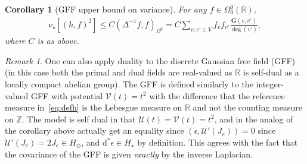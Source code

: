 \documentclass[11pt, reqno]{amsart}
\newtheorem{corollary}[theorem]{Corollary}
\numberwithin{equation}{section}
\theoremstyle{definition}
\theoremstyle{remark}
\newtheorem{remark}{Remark}
\renewcommand{\d}{\mathrm{d}}
\newcommand{\Green}{\ensuremath{\mathbf{G}}}
\newcommand{\J}{J}
\newcommand{\exact}{\star}
\newcommand{\coclosed}{\Diamond}
\begin{document}
\begin{corollary}[GFF upper bound on variance]\label{cor:upper}
	For any $f\in \Omega^0_0(\mathbb R)$,
	\begin{align*}
		\nu_{\exact}[(h, f)^2] \leq  C  ( \Delta^{-1}f,f)_{\Omega^0}=C\sum_{v,v'\in V} f_vf_{v'}\frac{\Green(v, v')}{\deg(v')},
	\end{align*}
	where $C$ is as above.
\end{corollary}

\begin{remark} \label{rem:gff}
	One can also apply duality to the discrete Gaussian free field (GFF) (in this case both the primal and dual fields are real-valued as $\mathbb R$ is self-dual as a locally compact abelian group).
	The GFF is defined similarly to the integer-valued GFF with potential $\mathcal V(t)=t^2$ with the difference that the reference measure in~\eqref{eq:defh} is the Lebesgue measure on $\mathbb R$ and not the counting measure on $\mathbb Z$. 
	The model is self dual in that $\mathcal U(t)=\mathcal V(t)=t^2$, and in the analog of the corollary above actually get an equality since $( \epsilon, \mathcal U'(\J_e))=0$ since $\mathcal U'(\J_e) =2 \J_e \in H_{\coclosed}$, and $\d^* \epsilon \in H_{\exact}$ by definition. This agrees with the fact that the covariance of the GFF is given \emph{exactly} by the inverse Laplacian.
\end{remark}
\end{document}
